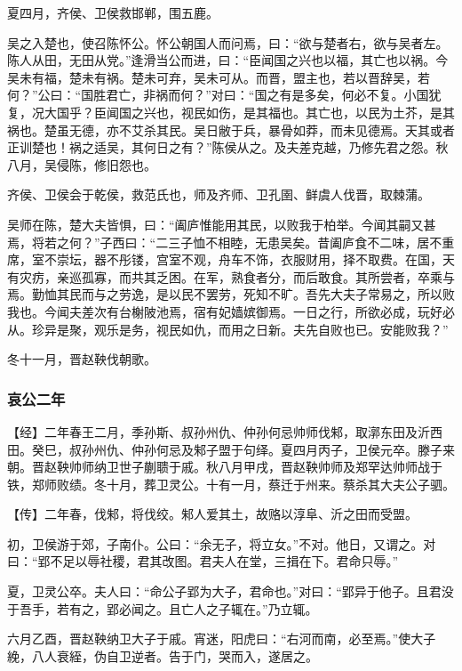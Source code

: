 \documentclass[]{article}
\begin{document}
夏四月，齐侯、卫侯救邯郸，围五鹿。

吴之入楚也，使召陈怀公。怀公朝国人而问焉，曰：``欲与楚者右，欲与吴者左。陈人从田，无田从党。''逢滑当公而进，曰：``臣闻国之兴也以福，其亡也以祸。今吴未有福，楚未有祸。楚未可弃，吴未可从。而晋，盟主也，若以晋辞吴，若何？''公曰：``国胜君亡，非祸而何？''对曰：``国之有是多矣，何必不复。小国犹复，况大国乎？臣闻国之兴也，视民如伤，是其福也。其亡也，以民为土芥，是其祸也。楚虽无德，亦不艾杀其民。吴日敝于兵，暴骨如莽，而未见德焉。天其或者正训楚也！祸之适吴，其何日之有？''陈侯从之。及夫差克越，乃修先君之怨。秋八月，吴侵陈，修旧怨也。

齐侯、卫侯会于乾侯，救范氏也，师及齐师、卫孔圉、鲜虞人伐晋，取棘蒲。

吴师在陈，楚大夫皆惧，曰：``阖庐惟能用其民，以败我于柏举。今闻其嗣又甚焉，将若之何？''子西曰：``二三子恤不相睦，无患吴矣。昔阖庐食不二味，居不重席，室不崇坛，器不彤镂，宫室不观，舟车不饰，衣服财用，择不取费。在国，天有灾疠，亲巡孤寡，而共其乏困。在军，熟食者分，而后敢食。其所尝者，卒乘与焉。勤恤其民而与之劳逸，是以民不罢劳，死知不旷。吾先大夫子常易之，所以败我也。今闻夫差次有台榭陂池焉，宿有妃嫱嫔御焉。一日之行，所欲必成，玩好必从。珍异是聚，观乐是务，视民如仇，而用之日新。夫先自败也已。安能败我？''

冬十一月，晋赵鞅伐朝歌。

\hypertarget{header-n3056}{%
\subsubsection{哀公二年}\label{header-n3056}}

【经】二年春王二月，季孙斯、叔孙州仇、仲孙何忌帅师伐邾，取漷东田及沂西田。癸巳，叔孙州仇、仲孙何忌及邾子盟于句绎。夏四月丙子，卫侯元卒。滕子来朝。晋赵鞅帅师纳卫世子蒯聩于戚。秋八月甲戌，晋赵鞅帅师及郑罕达帅师战于铁，郑师败绩。冬十月，葬卫灵公。十有一月，蔡迁于州来。蔡杀其大夫公子驷。

【传】二年春，伐邾，将伐绞。邾人爱其土，故赂以淳阜、沂之田而受盟。

初，卫侯游于郊，子南仆。公曰：``余无子，将立女。''不对。他日，又谓之。对曰：``郢不足以辱社稷，君其改图。君夫人在堂，三揖在下。君命只辱。''

夏，卫灵公卒。夫人曰：``命公子郢为大子，君命也。''对曰：``郢异于他子。且君没于吾手，若有之，郢必闻之。且亡人之子辄在。''乃立辄。

六月乙酉，晋赵鞅纳卫大子于戚。宵迷，阳虎曰：``右河而南，必至焉。''使大子絻，八人衰絰，伪自卫逆者。告于门，哭而入，遂居之。
\end{document}
